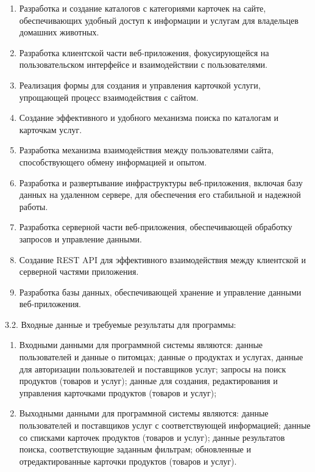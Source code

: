 \begin{enumerate}
\item Разработка и создание каталогов с категориями карточек на сайте, обеспечивающих удобный доступ к информации и услугам для владельцев домашних животных.
\item Разработка клиентской части веб-приложения, фокусирующейся на пользовательском интерфейсе и взаимодействии с пользователями.
\item Реализация формы для создания и управления карточкой услуги, упрощающей процесс взаимодействия с сайтом.
\item Создание эффективного и удобного механизма поиска по каталогам и карточкам услуг.
\item Разработка механизма взаимодействия между пользователями сайта, способствующего обмену информацией и опытом.
\item Разработка и развертывание инфраструктуры веб-приложения, включая базу данных на удаленном сервере, для обеспечения его стабильной и надежной работы.
\item Разработка серверной части веб-приложения, обеспечивающей обработку запросов и управление данными.
\item Создание REST API для эффективного взаимодействия между клиентской и серверной частями приложения.
\item Разработка базы данных, обеспечивающей хранение и управление данными веб-приложения.
\end{enumerate}

{\parindent0pt
  3.2. Входные данные и требуемые результаты для программы:}

\begin{enumerate}
\item Входными данными для программной системы являются: данные пользователей и данные о питомцах;
данные о продуктах и услугах, данные для авторизации пользователей и поставщиков услуг;
запросы на поиск продуктов (товаров и услуг);
данные для создания, редактирования и управления карточками продуктов (товаров и услуг);
\item Выходными данными для программной системы являются: данные пользователей и поставщиков услуг с соответствующей информацией;
данные со списками карточек продуктов (товаров и услуг);
данные результатов поиска, соответствующие заданным фильтрам;
обновленные и отредактированные карточки продуктов (товаров и услуг).
\end{enumerate}

